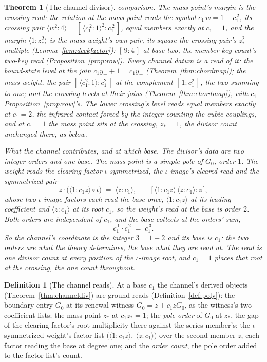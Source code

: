 \documentclass[11pt]{article}
\newtheorem{theorem}{Theorem}
\theoremstyle{definition}
\newtheorem{definition}{Definition}
\begin{document}
\begin{theorem}[The channel divisor]
comparison. The mass point's margin is the crossing read: the
relation at the mass point reads the symbol
$c_1\,w=1+c_1^{\,2}$, its crossing pair
$\langle w^2\!:\!4\rangle=[\,\langle
c_1^{\,2}\!:\!1\rangle^2:c_1^{\,2}\,]$, equal members exactly at
$c_1=1$, and the margin $\langle1\!:\!z_*^2\rangle$ is the mass
weight's own pair, its square the crossing pair's
$z_*^2$-multiple (Lemma~\ref{lem:deckfactor}): $[\,9:4\,]$ at
base two, the member-key count's two-key read
(Proposition~\ref{prop:row}).
Every channel datum is a read of it: the bound-state level
at the join $c_1y_++1=c_1y_-$ (Theorem~\ref{thm:chordmap}); the
mass weight, the pair $[\,\langle c_1^2:1\rangle:c_1^2\,]$ at the
complement $[\,1:c_1^2\,]$, the two summing to one; and the crossing
levels at their joins (Theorem~\ref{thm:chordmap}), with $c_1$
Proposition~\ref{prop:row}'s. The lower crossing's level reads equal
members exactly at
$c_1=2$, the infrared contact forced by the integer counting the cubic
couplings, and at $c_1=1$ the mass point sits at the crossing, $z_*=1$, the
divisor count unchanged there, as below.

\emph{What the channel contributes, and at which base.} The divisor's
data are \emph{two integer orders} and one base. The mass point is a simple
pole of $G_0$, order $1$. The weight reads the clearing factor
$\iota$-symmetrized, the $\iota$-image's cleared read and the symmetrized
pair
\[
z\cdot\big(\langle1\!:\!c_1z\rangle\circ\iota\big)
\;=\;\langle z\!:\!c_1\rangle ,
\qquad
\big[\,\langle1\!:\!c_1z\rangle\,\langle z\!:\!c_1\rangle:z\,\big] ,
\]
whose two $\iota$-image factors each read the base
once, $\langle1\!:\!c_1z\rangle$ at its leading coefficient and
$\langle z\!:\!c_1\rangle$ at its root
$c_1$, so the weight's read at the base is order $2$. Both orders are
independent of $c_1$, and the base collects at the orders' sum,
\[
c_1^{\,1}\cdot c_1^{\,2}\;=\;c_1^{\,3} .
\]
So the channel's coordinate is the integer $3=1+2$ and its base is $c_1$:
the two orders are what the theory determines, the base what they are read
at. The read is one divisor count at every position of the
$\iota$-image root, and $c_1=1$ places that root at the crossing,
the one count throughout.
\end{theorem}

\begin{definition}[The channel reads]\label{def:channelreads}
At a base $c_1$ the channel's derived objects
(Theorem~\ref{thm:channeldiv}) are ground reads
(Definition~\ref{def:poly}): the boundary entry $G_0$
at its renewal witness $G_0=z+c_1zG_0$, as the witness's two
coefficient lists; the mass point $z_*$ at $c_1z_*=1$;
the \emph{pole order} of $G_0$ at $z_*$, the gap of the clearing
factor's root multiplicity there against the series member's; the
$\iota$-symmetrized
weight's factor list
$\big(\langle1\!:\!c_1z\rangle,\ \langle z\!:\!c_1\rangle\big)$
over the second
member $z$,
each factor reading the base at degree one; and the \emph{order
count}, the pole order added to the factor list's count.
\end{definition}
\end{document}

